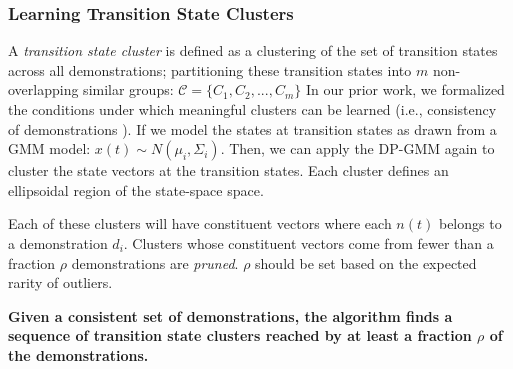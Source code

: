\documentclass[0-main.tex]{subfiles}
\begin{document}
\subsubsection{Learning Transition State Clusters}
A \emph{transition state cluster} is
defined as a clustering of the set of transition states across all demonstrations; partitioning these transition states into $m$ non-overlapping similar groups:
$
\mathcal{C} = \{C_1, C_2,...,C_m\}
$
In our prior work, we formalized the conditions under which meaningful clusters can be learned (i.e., consistency of demonstrations \cite{krishnan2015tsc}).
If we model the states at transition states as drawn from a GMM model: ${x}(t) \sim N(\mu_i, \Sigma_i)$.
Then, we can apply the DP-GMM again to cluster the state vectors at the transition states.
Each cluster defines an ellipsoidal region of the state-space space.

Each of these clusters will have constituent vectors where each $n(t)$ belongs to a demonstration $d_i$. 
Clusters whose constituent vectors come from fewer than a fraction $\rho$ demonstrations are \emph{pruned}.
$\rho$ should be set based on the expected rarity of outliers.

\vspace{0.5em}

\noindent \textbf{Given a consistent set of demonstrations, the algorithm finds a sequence of transition state clusters reached by at least a fraction $\rho$ of the demonstrations.}
\end{document}
